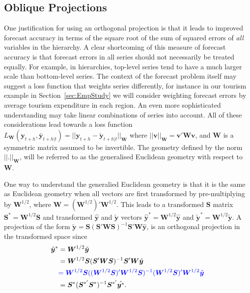 \documentclass[12pt]{article}
\theoremstyle{definition}
\begin{document}
\subsection{Oblique Projections}\label{sec:oblique}

One justification for using an orthogonal projection is that it leads to improved forecast accuracy in terms of the square root of the sum of squared errors of \emph{all} variables in the hierarchy. A clear shortcoming of this measure of forecast accuracy is that forecast errors in all series should not necessarily be treated equally. For example, in hierarchies, top-level series tend to have a much larger scale than bottom-level series.  {\color{blue} The context of the forecast problem itself may suggest a loss function that weights series differently, for instance in our tourism example in Section~\ref{sec:EmpStudy} we will consider weighting forecast errors by average tourism expenditure in each region}.  An even more sophisticated understanding may take linear combinations of series into account. All of these considerations lead towards {\color{blue} a loss function $L_{\bm W}(\bm{y}_{t+h},\bar{\bm{y}}_{t+h|t})=||{\bm{y}_{t+h}-\breve{\bm{y}}_{t+h|t}}||_{\bm{W}}$ where $||\bm{v}||_{\bm{W}}=\bm{v}'\bm{W}\bm{v}$, and $\bm{W}$ is a symmetric matrix assumed to be invertible.  The geometry defined by the norm $||.||_{\bm{W}}$, will be referred to as the generalised Euclidean geometry with respect to $\bm{W}$. } 

One way to understand the generalied Euclidean geometry is that it is the same as Euclidean geometry when all vectors are first transformed by pre-multiplying by $\bm{W}^{1/2}$, {\color{blue} where $\bm{W}=(\bm{W}^{1/2})'\bm{W}^{1/2}$}. This leads to a transformed $\bm{S}$ matrix $\bm{S}^*=\bm{W}^{1/2}\bm{S}$ and transformed $\hat{\bm{y}}$ and $\tilde{\bm{y}}$ vectors $\hat{\bm{y}}^*=\bm{W}^{1/2}\hat{\bm{y}}$ and $\tilde{\bm{y}}^*=\bm{W}^{1/2}\tilde{\bm{y}}$. {\color{blue} A projection of the form $\tilde{\bm{y}}=\bm{S}(\bm{S}'\bm{W}\bm{S})^{-1}\bm{S}'\bm{W}\hat{\bm{y}}$, is an} orthogonal projection in the transformed space since
\begin{align*}
  \tilde{\bm{y}}^*
    & = \bm{W}^{1/2}\tilde{\bm{y}} \\
    & = \bm{W}^{1/2}\bm{S}(\bm{S}'\bm{W}\bm{S})^{-1}\bm{S}'\bm{W}\hat{\bm{y}} \\
    &{\color{blue} = \bm{W}^{1/2}\bm{S}((\bm{W}^{1/2}\bm{S})'\bm{W}^{1/2}\bm{S})^{-1}(\bm{W}^{1/2}\bm{S})'\bm{W}^{1/2}\hat{\bm{y}}}\\
    & = \bm{S}^*(\bm{S}^{*'}\bm{S}^*)^{-1}\bm{S}^{*'}\hat{\bm{y}^*}.
\end{align*}
\end{document}
